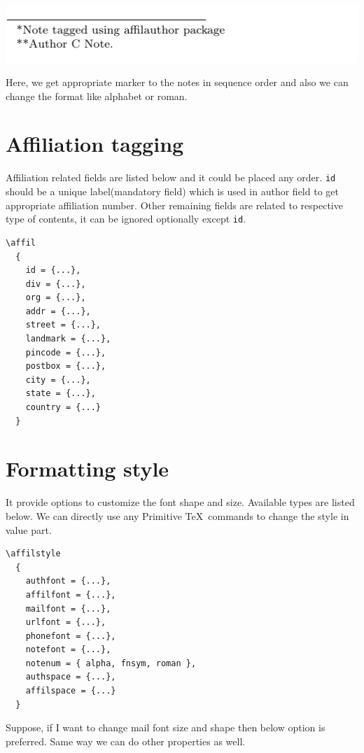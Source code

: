 \documentclass{article}
\begin{document}
\noindent\centerline{\includegraphics[width=.8\textwidth]{affilauthor-image3.pdf}}

Here, we get appropriate marker to the notes in sequence order and also we can change the format like alphabet or roman. 

\section*{Affiliation tagging}

Affiliation related fields are listed below and it could be placed any order. {\tt id} should be a unique label(mandatory field) which is used in author field to get appropriate affiliation number. Other remaining fields are related to respective type of contents, it can be ignored optionally except {\tt id}.

\begin{lstlisting}[style=mystyle]
\affil
  {
    id = {...},    
    div = {...},    
    org = {...},    
    addr = {...},    
    street = {...},    
    landmark = {...},    
    pincode = {...},    
    postbox = {...},    
    city = {...},    
    state = {...},    
    country = {...}    
  }
\end{lstlisting}

\section*{Formatting style}

It provide options to customize the font shape and size. Available types are listed below. We can directly use any Primitive \TeX\ commands to change the style in value part.

\begin{lstlisting}[style=mystyle]
\affilstyle
  {
    authfont = {...},
    affilfont = {...},
    mailfont = {...},
    urlfont = {...},
    phonefont = {...},
    notefont = {...},       
    notenum = { alpha, fnsym, roman },
    authspace = {...},    
    affilspace = {...}
  }
\end{lstlisting}

Suppose, if I want to change mail font size and shape then below option is preferred. Same way we can do other properties as well. 
\end{document}
